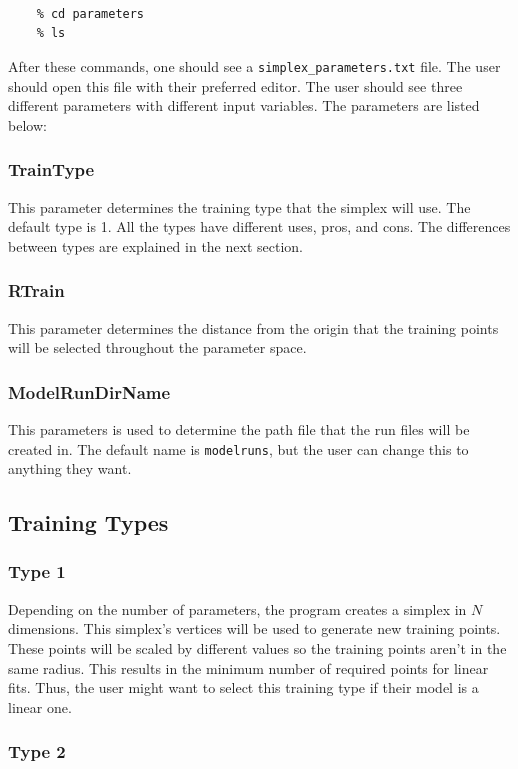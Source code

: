 \documentclass[12pt]{article}
\numberwithin{equation}{section}
\numberwithin{figure}{section}
\begin{document}
{\tt
\begin{verbatim}
    % cd parameters 
    % ls
\end{verbatim}
}
After these commands, one should see a {\tt{simplex\_parameters.txt}} file. The user should open this file with their preferred editor. The user should see three different parameters with different input variables. The parameters are listed below:

\subsubsection{TrainType}
This parameter determines the training type that the simplex will use. The default type is 1. All the types have different uses, pros, and cons. The differences between types are explained in the next section.

\subsubsection{RTrain}
This parameter determines the distance from the origin that the training points will be selected throughout the parameter space. 

\subsubsection{ModelRunDirName}
This parameters is used to determine the path file that the run files will be created in. The default name is {\tt{modelruns}}, but the user can change this to anything they want.

\subsection{Training Types}

\subsubsection{Type 1}
 Depending on the number of parameters, the program creates a simplex in $N$ dimensions. This simplex's vertices will be used to generate new training points. These points will be scaled by different values so the training points aren't in the same radius. This results in the minimum number of required points for linear fits. Thus, the user might want to select this training type if their model is a linear one.

\subsubsection{Type 2}
\end{document}
